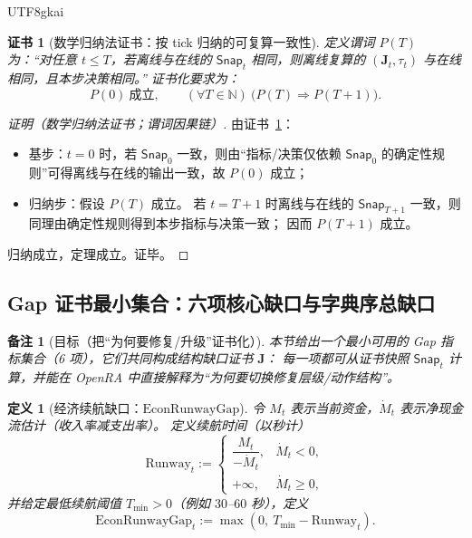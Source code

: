 \documentclass[12pt]{article}
\newtheorem{definition}{定义}[section]
\newtheorem{remark}{备注}[section]
\newtheorem{Certificate}{证书}[section]
\newcommand{\NN}{\mathbb{N}}
\begin{document}
\begin{CJK*}{UTF8}{gkai}
\begin{Certificate}[数学归纳法证书：按 tick 归纳的可复算一致性]
\label{cert:openra-snapshot-consistency-reproducible}
定义谓词 $P(T)$ 为：“对任意 $t\le T$，若离线与在线的 $\mathsf{Snap}_t$ 相同，则离线复算的 $(\mathbf{J}_t,\tau_t)$ 与在线相同，且本步决策相同。”
证书化要求为：
\[
  P(0)\ \text{成立},\qquad
  (\forall T\in\NN)\ \bigl(P(T)\Rightarrow P(T+1)\bigr).
\]
\end{Certificate}

\begin{proof}[证明（数学归纳法证书；谓词因果链）]
由证书~\ref{cert:openra-snapshot-consistency-reproducible}：
\begin{itemize}
  \item 基步：$t=0$ 时，若 $\mathsf{Snap}_0$ 一致，则由“指标/决策仅依赖 $\mathsf{Snap}_0$ 的确定性规则”可得离线与在线的输出一致，故 $P(0)$ 成立；
  \item 归纳步：假设 $P(T)$ 成立。
  若 $t=T+1$ 时离线与在线的 $\mathsf{Snap}_{T+1}$ 一致，则同理由确定性规则得到本步指标与决策一致；
  因而 $P(T+1)$ 成立。
\end{itemize}
归纳成立，定理成立。证毕。
\end{proof}

\subsection{Gap 证书最小集合：六项核心缺口与字典序总缺口}
\label{sec:openra-gap-certificate-minimal-set}

\begin{remark}[目标（把“为何要修复/升级”证书化）]
本节给出一个最小可用的 Gap 指标集合（6 项），它们共同构成结构缺口证书 $\mathbf{J}$：
每一项都可从证书快照 $\mathsf{Snap}_t$ 计算，并能在 \textsf{OpenRA} 中直接解释为“为何要切换修复层级/动作结构”。
\end{remark}

\begin{definition}[经济续航缺口：$\mathrm{EconRunwayGap}$]
\label{def:openra-gap-econ-runway}
令 $M_t$ 表示当前资金，$\dot M_t$ 表示净现金流估计（收入率减支出率）。
定义续航时间（以秒计）
\[
  \mathrm{Runway}_t
  :=
  \begin{cases}
    \dfrac{M_t}{-\dot M_t}, & \dot M_t < 0,\\[6pt]
    +\infty, & \dot M_t \ge 0,
  \end{cases}
\]
并给定最低续航阈值 $T_{\min}>0$（例如 $30$--$60$ 秒），定义
\[
  \mathrm{EconRunwayGap}_t := \max(0,\ T_{\min}-\mathrm{Runway}_t).
\]
\end{definition}


\end{CJK*}
\end{document}
